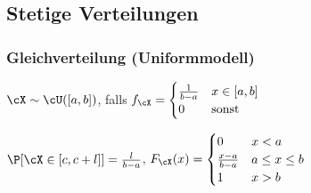 \subsection{Stetige Verteilungen}

\subsubsection{Gleichverteilung (Uniformmodell)}

\shortdefinition $\cX \sim \cU([a, b])$, falls
$f_\cX = \begin{cases}
        \frac{1}{b - a} & x \in [a, b] \\
        0               & \text{sonst}
    \end{cases}$

\shortremark $\P[\cX \in [c, c + l]] = \frac{l}{b - a}$,
$F_\cX(x) = \begin{cases}
        0                   & x < a           \\
        \frac{x - a}{b - a} & a \leq x \leq b \\
        1                   & x > b
    \end{cases}$
